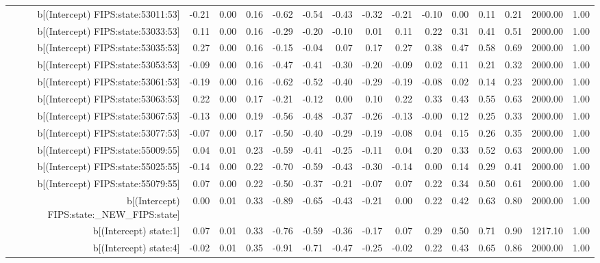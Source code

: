 \begin{table}[ht]
\begin{tabular}{rrrrrrrrrrrrrrr}
  b[(Intercept) FIPS:state:53011:53] & -0.21 & 0.00 & 0.16 & -0.62 & -0.54 & -0.43 & -0.32 & -0.21 & -0.10 & 0.00 & 0.11 & 0.21 & 2000.00 & 1.00 \\ 
  b[(Intercept) FIPS:state:53033:53] & 0.11 & 0.00 & 0.16 & -0.29 & -0.20 & -0.10 & 0.01 & 0.11 & 0.22 & 0.31 & 0.41 & 0.51 & 2000.00 & 1.00 \\ 
  b[(Intercept) FIPS:state:53035:53] & 0.27 & 0.00 & 0.16 & -0.15 & -0.04 & 0.07 & 0.17 & 0.27 & 0.38 & 0.47 & 0.58 & 0.69 & 2000.00 & 1.00 \\ 
  b[(Intercept) FIPS:state:53053:53] & -0.09 & 0.00 & 0.16 & -0.47 & -0.41 & -0.30 & -0.20 & -0.09 & 0.02 & 0.11 & 0.21 & 0.32 & 2000.00 & 1.00 \\ 
  b[(Intercept) FIPS:state:53061:53] & -0.19 & 0.00 & 0.16 & -0.62 & -0.52 & -0.40 & -0.29 & -0.19 & -0.08 & 0.02 & 0.14 & 0.23 & 2000.00 & 1.00 \\ 
  b[(Intercept) FIPS:state:53063:53] & 0.22 & 0.00 & 0.17 & -0.21 & -0.12 & 0.00 & 0.10 & 0.22 & 0.33 & 0.43 & 0.55 & 0.63 & 2000.00 & 1.00 \\ 
  b[(Intercept) FIPS:state:53067:53] & -0.13 & 0.00 & 0.19 & -0.56 & -0.48 & -0.37 & -0.26 & -0.13 & -0.00 & 0.12 & 0.25 & 0.33 & 2000.00 & 1.00 \\ 
  b[(Intercept) FIPS:state:53077:53] & -0.07 & 0.00 & 0.17 & -0.50 & -0.40 & -0.29 & -0.19 & -0.08 & 0.04 & 0.15 & 0.26 & 0.35 & 2000.00 & 1.00 \\ 
  b[(Intercept) FIPS:state:55009:55] & 0.04 & 0.01 & 0.23 & -0.59 & -0.41 & -0.25 & -0.11 & 0.04 & 0.20 & 0.33 & 0.52 & 0.63 & 2000.00 & 1.00 \\ 
  b[(Intercept) FIPS:state:55025:55] & -0.14 & 0.00 & 0.22 & -0.70 & -0.59 & -0.43 & -0.30 & -0.14 & 0.00 & 0.14 & 0.29 & 0.41 & 2000.00 & 1.00 \\ 
  b[(Intercept) FIPS:state:55079:55] & 0.07 & 0.00 & 0.22 & -0.50 & -0.37 & -0.21 & -0.07 & 0.07 & 0.22 & 0.34 & 0.50 & 0.61 & 2000.00 & 1.00 \\ 
  b[(Intercept) FIPS:state:\_NEW\_FIPS:state] & 0.00 & 0.01 & 0.33 & -0.89 & -0.65 & -0.43 & -0.21 & 0.00 & 0.22 & 0.42 & 0.63 & 0.80 & 2000.00 & 1.00 \\ 
  b[(Intercept) state:1] & 0.07 & 0.01 & 0.33 & -0.76 & -0.59 & -0.36 & -0.17 & 0.07 & 0.29 & 0.50 & 0.71 & 0.90 & 1217.10 & 1.00 \\ 
  b[(Intercept) state:4] & -0.02 & 0.01 & 0.35 & -0.91 & -0.71 & -0.47 & -0.25 & -0.02 & 0.22 & 0.43 & 0.65 & 0.86 & 2000.00 & 1.00 \\ 

\end{tabular}
\end{table}
